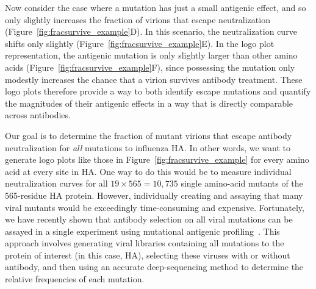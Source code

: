 \documentclass[11pt]{article}
\begin{document}
Now consider the case where a mutation has just a small antigenic effect, and so only slightly increases the fraction of virions that escape neutralization (Figure~\ref{fig:fracsurvive_example}D).
In this scenario, the neutralization curve shifts only slightly (Figure~\ref{fig:fracsurvive_example}E).
In the logo plot representation, the antigenic mutation is only slightly larger than other amino acids (Figure~\ref{fig:fracsurvive_example}F), since possessing the mutation only modestly increases the chance that a virion survives antibody treatment.
These logo plots therefore provide a way to both identify escape mutations and quantify the magnitudes of their antigenic effects in a way that is directly comparable across antibodies.

Our goal is to determine the fraction of mutant virions that escape antibody neutralization for \emph{all} mutations to influenza HA.
In other words, we want to generate logo plots like those in Figure~\ref{fig:fracsurvive_example} for every amino acid at every site in HA.
One way to do this would be to measure individual neutralization curves for all $19\times565 = 10,735$ single amino-acid mutants of the 565-residue HA protein.
However, individually creating and assaying that many viral mutants would be exceedingly time-consuming and expensive.
Fortunately, we have recently shown that antibody selection on all viral mutations can be assayed in a single experiment using mutational antigenic profiling~\citep{doud2017complete,dingens2017comprehensive}.
This approach involves generating viral libraries containing all mutations to the protein of interest (in this case, HA), selecting these viruses with or without antibody, and then using an accurate deep-sequencing method to determine the relative frequencies of each mutation.
\end{document}
